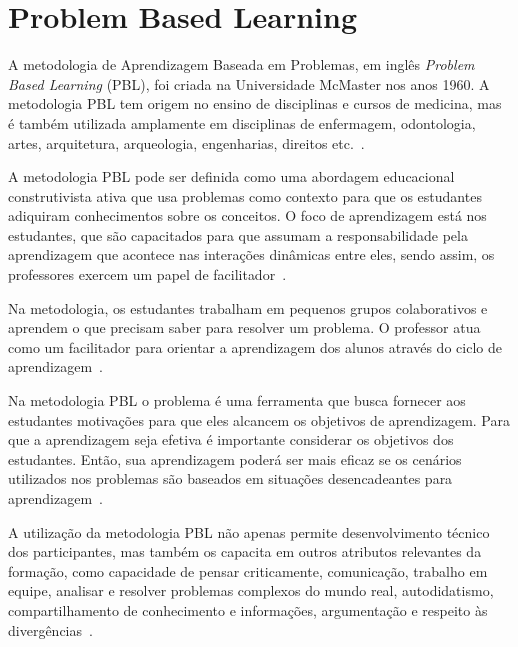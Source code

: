 \acresetall
\section{Problem Based Learning}

A metodologia de Aprendizagem Baseada em Problemas, em
inglês \textit{Problem Based Learning} (PBL),
foi criada na Universidade McMaster nos anos 1960.
A metodologia PBL tem origem no ensino de disciplinas e cursos de medicina,
mas é também utilizada amplamente em disciplinas de enfermagem,
odontologia, artes, arquitetura, arqueologia, engenharias, direitos
etc.~\cite{albanese2010problem, amos1998problem}.

A metodologia PBL pode ser definida como uma abordagem educacional
construtivista ativa que usa problemas como contexto para que os estudantes
adiquiram conhecimentos sobre os conceitos. O foco de aprendizagem está
nos estudantes, que são capacitados para que assumam a responsabilidade pela
aprendizagem que acontece nas interações dinâmicas
entre eles, sendo assim, os professores exercem um papel
de facilitador~\cite{dolmans2005problem, albanese2010problem,
amos1998problem, forsythe2002problem}.

Na metodologia, os estudantes trabalham em pequenos grupos colaborativos
e aprendem o que precisam saber para resolver um problema.
O professor atua como um facilitador para orientar a aprendizagem
dos alunos através do ciclo
de aprendizagem~\cite{hmelo2004problem}.

Na metodologia PBL o problema é uma ferramenta que busca fornecer
aos estudantes motivações para que eles alcancem os
objetivos de aprendizagem.
Para que a aprendizagem seja efetiva é importante considerar os objetivos
dos estudantes.
Então, sua aprendizagem poderá ser mais eficaz se os cenários utilizados
nos problemas são baseados em situações desencadeantes para
aprendizagem~\cite{wood2003problem, o2012practical, amos1998problem}.

A utilização da metodologia PBL não apenas permite desenvolvimento
técnico dos participantes, mas também os capacita em outros
atributos relevantes da formação, como capacidade de pensar
criticamente, comunicação, trabalho em equipe,
analisar e resolver problemas complexos do mundo real,
autodidatismo, compartilhamento de conhecimento e informações,
argumentação e respeito às
divergências~\cite{wood2003problem, savery2015overview}.

